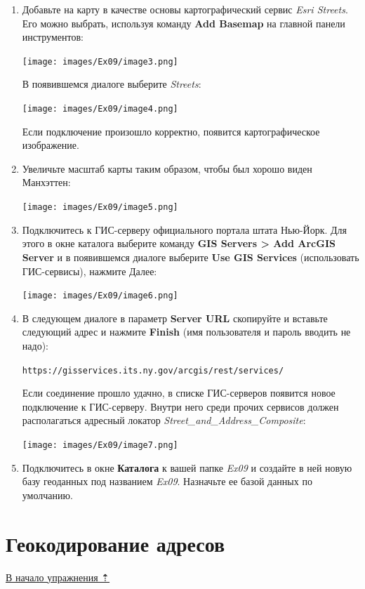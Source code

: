\documentclass[12pt,]{book}
\begin{document}
\begin{enumerate}
\def\labelenumi{\arabic{enumi}.}
\item
  Добавьте на карту в качестве основы картографический сервис \emph{Esri Streets}. Его можно выбрать, используя команду \textbf{Add Basemap} на главной панели инструментов:

  \texttt{[image: images/Ex09/image3.png]}

  В появившемся диалоге выберите \emph{Streets}:

  \texttt{[image: images/Ex09/image4.png]}

  Если подключение произошло корректно, появится картографическое
  изображение.
\item
  Увеличьте масштаб карты таким образом, чтобы был хорошо виден Манхэттен:

  \texttt{[image: images/Ex09/image5.png]}
\item
  Подключитесь к ГИС-серверу официального портала штата Нью-Йорк. Для этого в окне каталога выберите команду \textbf{GIS Servers \textgreater{} Add ArcGIS Server} и в появившемся диалоге выберите \textbf{Use GIS Services} (использовать ГИС-сервисы), нажмите Далее:

  \texttt{[image: images/Ex09/image6.png]}
\item
  В следующем диалоге в параметр \textbf{Server URL} скопируйте и вставьте следующий адрес и нажмите \textbf{Finish} (имя пользователя и пароль вводить не надо):

  \texttt{https://gisservices.its.ny.gov/arcgis/rest/services/}

  Если соединение прошло удачно, в списке ГИС-серверов появится новое подключение к ГИС-серверу. Внутри него среди прочих сервисов должен располагаться адресный локатор \emph{Street\_and\_Address\_Composite}:

  \texttt{[image: images/Ex09/image7.png]}
\item
  Подключитесь в окне \textbf{Каталога} к вашей папке \emph{Ex09} и создайте в ней новую базу геоданных под названием \emph{Ex09}. Назначьте ее базой данных по умолчанию.
\end{enumerate}

\hypertarget{geocoding-addresses}{%
\section{Геокодирование адресов}\label{geocoding-addresses}}

\protect\hyperlink{geocoding}{В начало упражнения ⇡}
\end{document}

